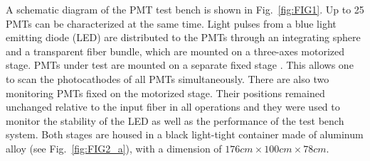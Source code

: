 \documentclass{nst}
\providecommand{\DIFadd}[1]{{\protect\color{yellow} \sf #1}} %
\providecommand{\DIFaddbegin}{} %
\providecommand{\DIFaddend}{} %
\providecommand{\DIFdelbegin}{} %
\providecommand{\DIFdelend}{} %
\begin{document}
A schematic diagram of the PMT test bench is shown in Fig.~\ref{fig:FIG1}.
Up to 25 PMTs can be \DIFdelbegin \DIFdelend \DIFaddbegin \DIFadd{characterized }\DIFaddend at the same time.
Light pulses from a blue light emitting diode (LED) are distributed to the PMTs through an integrating sphere and a transparent fiber bundle, which are mounted on a three-axes motorized stage.
PMTs under test \DIFdelbegin \DIFdelend \DIFaddbegin \DIFadd{are }\DIFaddend mounted on a separate fixed stage\DIFdelbegin \DIFdelend \DIFaddbegin \DIFadd{. This allows one to scan the photocathodes of all PMTs }\DIFaddend simultaneously.
There are also two \DIFdelbegin \DIFdelend \DIFaddbegin \DIFadd{monitoring }\DIFaddend PMTs fixed on the motorized stage.
Their positions \DIFdelbegin \DIFdelend \DIFaddbegin \DIFadd{remained unchanged }\DIFaddend relative to the input fiber in all operations and they \DIFdelbegin \DIFdelend \DIFaddbegin \DIFadd{were }\DIFaddend used to monitor the stability of the LED as well as the performance of the test bench system.
Both stages are housed in a black light-tight container made of aluminum alloy (see Fig.~\ref{fig:FIG2_a}), with a dimension of $176cm\times100cm\times78cm$.
\end{document}
